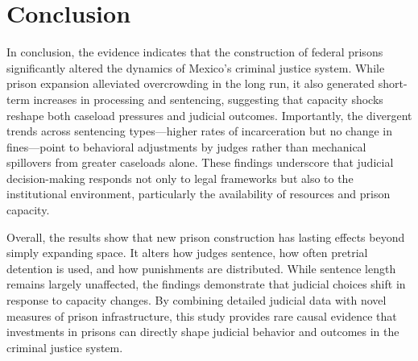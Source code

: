 \section{Conclusion}
\label{sec:conclusion}

In conclusion, the evidence indicates that the construction of federal prisons significantly altered the dynamics of Mexico’s criminal justice system. While prison expansion alleviated overcrowding in the long run, it also generated short-term increases in processing and sentencing, suggesting that capacity shocks reshape both caseload pressures and judicial outcomes. Importantly, the divergent trends across sentencing types—higher rates of incarceration but no change in fines—point to behavioral adjustments by judges rather than mechanical spillovers from greater caseloads alone. These findings underscore that judicial decision-making responds not only to legal frameworks but also to the institutional environment, particularly the availability of resources and prison capacity.

Overall, the results show that new prison construction has lasting effects beyond simply expanding space. It alters how judges sentence, how often pretrial detention is used, and how punishments are distributed. While sentence length remains largely unaffected, the findings demonstrate that judicial choices shift in response to capacity changes. By combining detailed judicial data with novel measures of prison infrastructure, this study provides rare causal evidence that investments in prisons can directly shape judicial behavior and outcomes in the criminal justice system.